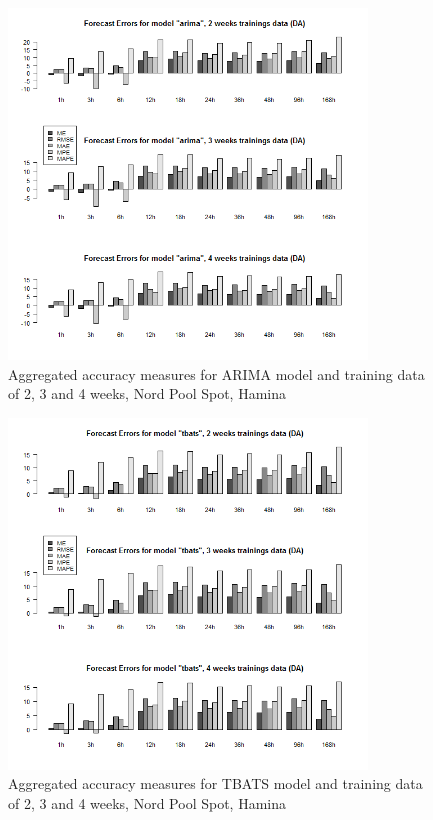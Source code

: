 \begin{figure}[!ht]
	\centering
		\includegraphics[width=0.85\textwidth]{figures/appendix_forecast_results/da_sim_1_x_1w_1w_arima.png}
	\caption{Aggregated accuracy measures for ARIMA model and training data of 2, 3 and 4 weeks, Nord
Pool Spot, Hamina}
	\label{fig:app_da_sim_1_x_1w_1w_arima}
	\vspace*{-1.6in}
\end{figure}




\begin{figure}[!ht]
	\centering
		\includegraphics[width=0.85\textwidth]{figures/appendix_forecast_results/da_sim_1_x_1w_1w_tbats.png}
	\caption{Aggregated accuracy measures for TBATS model and training data of 2, 3 and 4 weeks, Nord
Pool Spot, Hamina}
	\label{fig:app_da_sim_1_x_1w_1w_tbats}
\end{figure}



